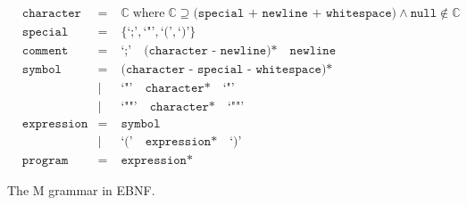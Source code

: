 \documentclass{article}
\begin{document}
    \begin{figure}[h]
        \centering
        \begin{align*}
            &\texttt{character} &=&\;\mathbb{C}\;\text{where}\;\mathbb{C}\supseteq\texttt{(special + newline + whitespace)}\land\texttt{null}\notin\mathbb{C}\\
            &\texttt{special}   &=&\;\{\texttt{`;'},\texttt{`"'},\texttt{`('},\texttt{`)'}\}\\
            &\texttt{comment}   &=&\;\texttt{`;'}\quad\texttt{(character - newline)*}\quad\texttt{newline}\\
            &\texttt{symbol}    &=&\;\texttt{(character - special - whitespace)*}\\
            &                   &|&\;\texttt{`"'}\quad\texttt{character*}\quad\texttt{`"'}\\
            &                   &|&\;\texttt{`""'}\quad\texttt{character*}\quad\texttt{`""'}\\
            &\texttt{expression}&=&\;\texttt{symbol}\\
            &                   &|&\;\texttt{`('}\quad\texttt{expression*}\quad\texttt{`)'}\\
            &\texttt{program}   &=&\;\texttt{expression*}
        \end{align*}
        \caption{The M grammar in EBNF.}
    \end{figure}
\end{document}
